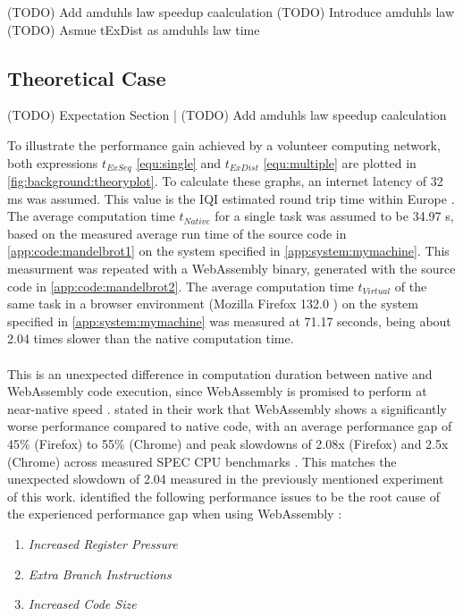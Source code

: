 (TODO) Add amduhls law speedup caalculation
(TODO) Introduce amduhls law
(TODO) Asmue tExDist as amduhls law time 

\subsection{Theoretical Case}
\label{subsec:concept:theroy_example}
(TODO) Expectation Section | (TODO) Add amduhls law speedup caalculation

To illustrate the performance gain achieved by a volunteer computing network, both expressions $t_{ExSeq}$ \eqref{equ:single} and $t_{ExDist}$ \eqref{equ:multiple} are plotted in \autoref{fig:background:theoryplot}. To calculate these graphs, an internet latency of 32 ms \cite{backend:latency} was assumed. This value is the \ac{IQI} estimated round trip time within Europe \cite{backend:latency}. The average computation time $t_{Native}$ for a single task was assumed to be 34.97 s, based on the measured average run time of the source code in \autoref{app:code:mandelbrot1} on the system specified in \autoref{app:system:mymachine}. This measurment was repeated with a WebAssembly binary, generated with the source code in \autoref{app:code:mandelbrot2}. The average computation time $t_{Virtual}$ of the same task in a browser environment (Mozilla Firefox 132.0 \cite{background:firefox}) on the system specified in \autoref{app:system:mymachine} was measured at 71.17 seconds, being about 2.04 times slower than the native computation time.
\\~\\
This is an unexpected difference in computation duration between native and WebAssembly code execution, since WebAssembly is promised to perform at near-native speed \cite{methodology:wasm, methodology:wasmW3C}. \citeauthor{background:not-so-fast} stated in their work that WebAssembly shows a significantly worse performance compared to native code, with an average performance gap of 45\% (Firefox) to 55\% (Chrome) and peak slowdowns of 2.08x (Firefox) and 2.5x (Chrome) across measured SPEC \acs{CPU} benchmarks \cite{background:not-so-fast}. This matches the unexpected slowdown of 2.04 measured in the previously mentioned experiment of this work. \citeauthor{background:not-so-fast} identified the following performance issues to be the root cause of the experienced performance gap when using WebAssembly \cite{background:not-so-fast}:
\begin{enumerate}
  \item \emph{Increased Register Pressure}
  \item \emph{Extra Branch Instructions}
  \item \emph{Increased Code Size}
\end{enumerate}
